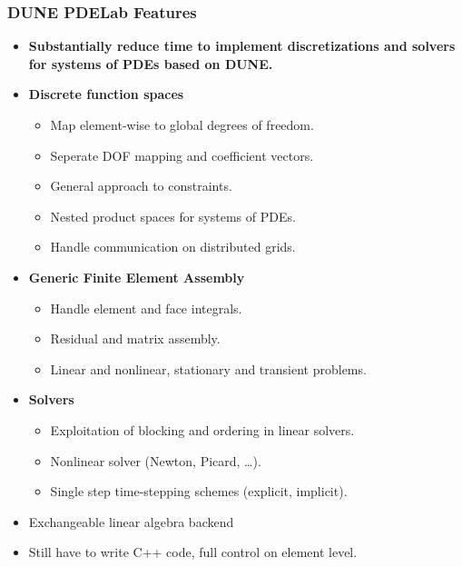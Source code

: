 \begin{frame}
\frametitle<presentation>{DUNE PDELab Features}
\begin{itemize}
\item \textbf{Substantially reduce time to implement
discretizations and solvers for systems of PDEs based on DUNE.}
\item \textbf{Discrete function spaces}
\begin{itemize}
\item Map element-wise to global degrees of freedom.
\item Seperate DOF mapping and coefficient vectors.
\item General approach to constraints.
\item Nested product spaces for systems of PDEs.
\item Handle communication on distributed grids.
\end{itemize}
\item \textbf{Generic Finite Element Assembly}
\begin{itemize}
\item Handle element and face integrals.
\item Residual and matrix assembly.
\item Linear and nonlinear, stationary and transient problems.
\end{itemize}
\item \textbf{Solvers}
\begin{itemize}
\item Exploitation of blocking and ordering in linear solvers.
\item Nonlinear solver (Newton, Picard, \ldots).
\item Single step time-stepping schemes (explicit, implicit).
\end{itemize}
\item Exchangeable linear algebra backend
\item Still have to write C++ code, full control on element level.
\end{itemize}
\end{frame}

